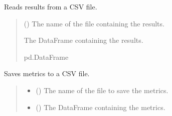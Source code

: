 \documentclass[letterpaper,10pt,english]{sphinxmanual}
\begin{document}
\begin{fulllineitems}
\begin{fulllineitems}
\label{\detokenize{application.services:application.services.FileSystemService.FileSystemService.read_resultsFrom}}
\pysigstartsignatures
{}
\pysigstopsignatures
\sphinxAtStartPar
Reads results from a CSV file.
\begin{quote}\begin{description}
\sphinxAtStartPar
{} () \textendash{} The name of the file containing the results.

\sphinxAtStartPar
The DataFrame containing the results.

\sphinxAtStartPar
pd.DataFrame

\end{description}\end{quote}

\end{fulllineitems}


\begin{fulllineitems}
\label{\detokenize{application.services:application.services.FileSystemService.FileSystemService.save_metricsTo}}
\pysigstartsignatures
{}
\pysigstopsignatures
\sphinxAtStartPar
Saves metrics to a CSV file.
\begin{quote}\begin{description}
\begin{itemize}
\item {} 
\sphinxAtStartPar
{} () \textendash{} The name of the file to save the metrics.

\item {} 
\sphinxAtStartPar
{} () \textendash{} The DataFrame containing the metrics.


\end{itemize}
\end{description}
\end{quote}
\end{fulllineitems}
\end{fulllineitems}
\end{document}

